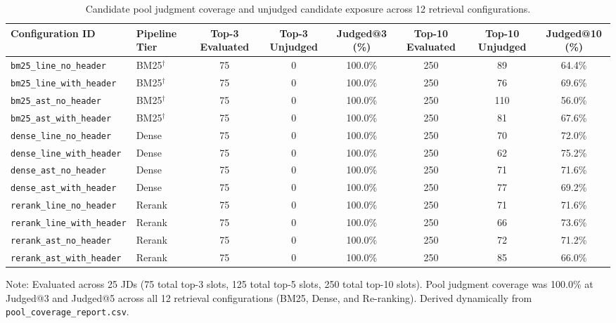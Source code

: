 \begin{table}[t]
\caption{Candidate pool judgment coverage and unjudged candidate exposure across 12 retrieval configurations.}
\label{tab:candidate_pool_coverage}
\centering\footnotesize
\setlength{\tabcolsep}{3pt}
\begin{threeparttable}
\begin{tabular}{@{}llcccccc@{}}
\toprule
Configuration ID & Pipeline Tier & Top-3 Evaluated & Top-3 Unjudged & Judged@3 (\%) & Top-10 Evaluated & Top-10 Unjudged & Judged@10 (\%) \\
\midrule
\texttt{bm25\_line\_no\_header} & BM25$^{\dagger}$ & 75 & 0 & 100.0\% & 250 & 89 & 64.4\% \\
\texttt{bm25\_line\_with\_header} & BM25$^{\dagger}$ & 75 & 0 & 100.0\% & 250 & 76 & 69.6\% \\
\texttt{bm25\_ast\_no\_header} & BM25$^{\dagger}$ & 75 & 0 & 100.0\% & 250 & 110 & 56.0\% \\
\texttt{bm25\_ast\_with\_header} & BM25$^{\dagger}$ & 75 & 0 & 100.0\% & 250 & 81 & 67.6\% \\
\cmidrule(lr){1-8}
\texttt{dense\_line\_no\_header} & Dense & 75 & 0 & 100.0\% & 250 & 70 & 72.0\% \\
\texttt{dense\_line\_with\_header} & Dense & 75 & 0 & 100.0\% & 250 & 62 & 75.2\% \\
\texttt{dense\_ast\_no\_header} & Dense & 75 & 0 & 100.0\% & 250 & 71 & 71.6\% \\
\texttt{dense\_ast\_with\_header} & Dense & 75 & 0 & 100.0\% & 250 & 77 & 69.2\% \\
\cmidrule(lr){1-8}
\texttt{rerank\_line\_no\_header} & Rerank & 75 & 0 & 100.0\% & 250 & 71 & 71.6\% \\
\texttt{rerank\_line\_with\_header} & Rerank & 75 & 0 & 100.0\% & 250 & 66 & 73.6\% \\
\texttt{rerank\_ast\_no\_header} & Rerank & 75 & 0 & 100.0\% & 250 & 72 & 71.2\% \\
\texttt{rerank\_ast\_with\_header} & Rerank & 75 & 0 & 100.0\% & 250 & 85 & 66.0\% \\
\bottomrule
\end{tabular}
\begin{tablenotes}\footnotesize
\item[] Note: Evaluated across 25 JDs (75 total top-3 slots, 125 total top-5 slots, 250 total top-10 slots). Pool judgment coverage was 100.0\% at Judged@3 and Judged@5 across all 12 retrieval configurations (BM25, Dense, and Re-ranking). Derived dynamically from \texttt{pool\_coverage\_report.csv}.
\end{tablenotes}
\end{threeparttable}
\end{table}
